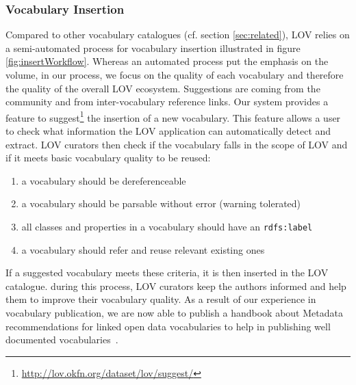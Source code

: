 \documentclass{iosart2c}
\begin{document}
	\subsubsection{Vocabulary Insertion} Compared to other vocabulary catalogues (cf. section \ref{sec:related}), LOV relies on a semi-automated process for vocabulary insertion illustrated in figure \ref{fig:insertWorkflow}. Whereas an automated process put the emphasis on the volume, in our process, we focus on the quality of each vocabulary and therefore the quality of the overall LOV ecosystem. Suggestions are coming from the community and from inter-vocabulary reference links. Our system provides a feature to suggest\footnote{\url{http://lov.okfn.org/dataset/lov/suggest/}} the insertion of a new vocabulary. This feature allows a user to check what information the LOV application can automatically detect and extract. LOV curators then check if the vocabulary falls in the scope of LOV and if it meets basic vocabulary quality to be reused:
\begin{enumerate}
 \item a vocabulary should be dereferenceable
 \item a vocabulary should be parsable without error (warning tolerated)
 \item all classes and properties in a vocabulary should have an \texttt{rdfs:label}
 \item a vocabulary should refer and reuse relevant existing ones
\end{enumerate}
If a suggested vocabulary meets these criteria, it is then inserted in the LOV catalogue. during this process, LOV curators keep the authors informed and help them to improve their vocabulary quality. As a result of our experience in vocabulary publication, we are now able to publish a handbook about Metadata recommendations for linked open data vocabularies to help in publishing well documented vocabularies~\cite{vandenbussche2011metadata}.
\end{document}
